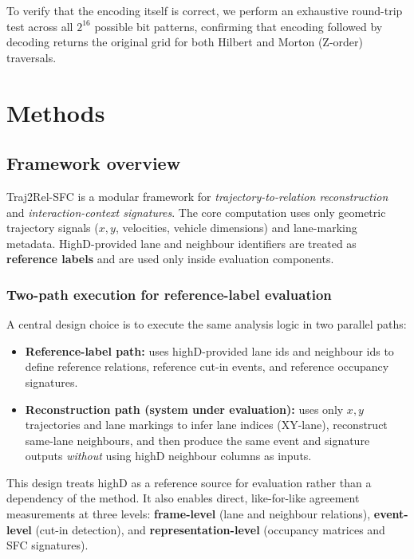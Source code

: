 \documentclass[12pt,a4paper,twoside,openright]{report}
\newcommand{\FrameworkName}{Traj2Rel-SFC}
\begin{document}
    To verify that the encoding itself is correct, we perform an exhaustive round-trip test across all $2^{16}$ possible bit patterns, confirming that encoding followed by decoding returns the original grid for both Hilbert and Morton (Z-order) traversals.

    \chapter{Methods}
    \label{chap:methods}

    \section{Framework overview}
    \FrameworkName{} is a modular framework for \emph{trajectory-to-relation reconstruction} and \emph{interaction-context signatures}. The core computation uses only geometric trajectory signals ($x,y$, velocities, vehicle dimensions) and lane-marking metadata. HighD-provided lane and neighbour identifiers are treated as \textbf{reference labels} and are used only inside evaluation components.

    \subsection*{Two-path execution for reference-label evaluation}
    A central design choice is to execute the same analysis logic in two parallel paths:

    \begin{itemize}[leftmargin=1.2em]
  \item \textbf{Reference-label path:} uses highD-provided lane ids and neighbour ids to define reference relations, reference cut-in events, and reference occupancy signatures.
  \item \textbf{Reconstruction path (system under evaluation):} uses only $x,y$ trajectories and lane markings to infer lane indices (XY-lane), reconstruct same-lane neighbours, and then produce the same event and signature outputs \emph{without} using highD neighbour columns as inputs.
    \end{itemize}

    This design treats highD as a reference source for evaluation rather than a dependency of the method. It also enables direct, like-for-like agreement measurements at three levels: \textbf{frame-level} (lane and neighbour relations), \textbf{event-level} (cut-in detection), and \textbf{representation-level} (occupancy matrices and SFC signatures).
\end{document}

